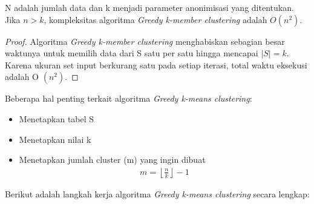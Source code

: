 \begin{theorem}
N adalah jumlah data dan k menjadi parameter anonimisasi yang ditentukan. Jika $n > k$, kompleksitas algoritma \textit{Greedy k-member clustering} adalah $O(n^2)$.
\end{theorem}

\begin{proof}
Algoritma \textit{Greedy k-member clustering} menghabiskan sebagian besar waktunya untuk memilih data dari S satu per satu hingga mencapai $|S| = k$. Karena ukuran set input berkurang satu pada setiap iterasi, total waktu eksekusi adalah O $(n^2)$.
\end{proof}

\vspace{0.5cm}
\noindent Beberapa hal penting terkait algoritma \textit{Greedy k-means clustering}:

\begin{itemize}
\item Menetapkan tabel S  
\item Menetapkan nilai k
\item Menetapkan jumlah cluster (m) yang ingin dibuat
\begin{align}
m = \left \lfloor \frac{n}{k} \right \rfloor - 1
\end{align}
\end{itemize}

\vspace{0.5cm}
\noindent Berikut adalah langkah kerja algoritma \textit{Greedy k-means clustering} secara lengkap:

